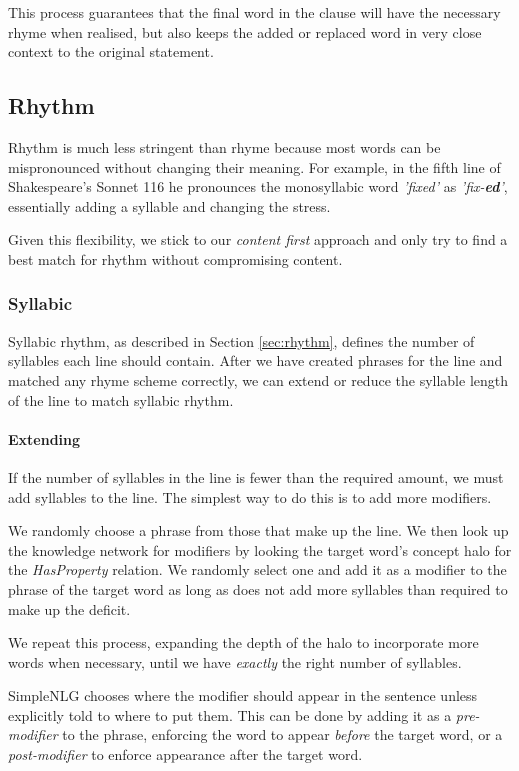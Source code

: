 This process guarantees that the final word in the clause will have the necessary rhyme when realised, but also keeps the added or replaced word in very close context to the original statement.


\subsection{Rhythm}
Rhythm is much less stringent than rhyme because most words can be mispronounced without changing their meaning. For example, in the fifth line of Shakespeare's Sonnet 116 he pronounces the monosyllabic word \textit{'fixed'} as \textit{'fix-\textbf{ed}'}, essentially adding a syllable and changing the stress.

Given this flexibility, we stick to our \textit{content first} approach and only try to find a best match for rhythm without compromising content. 

\subsubsection{Syllabic}
Syllabic rhythm, as described in Section \ref{sec:rhythm}, defines the number of syllables each line should contain. After we have created phrases for the line and matched any rhyme scheme correctly, we can extend or reduce the syllable length of the line to match syllabic rhythm.

\paragraph{Extending}
If the number of syllables in the line is fewer than the required amount, we must add syllables to the line. The simplest way to do this is to add more modifiers.

We randomly choose a phrase from those that make up the line. We then look up the knowledge network for modifiers by looking the target word's concept halo for the \textit{HasProperty} relation. We randomly select one and add it as a modifier to the phrase of the target word as long as does not add more syllables than required to make up the deficit.

We repeat this process, expanding the depth of the halo to incorporate more words when necessary, until we have \textit{exactly} the right number of syllables.

SimpleNLG chooses where the modifier should appear in the sentence unless explicitly told to where to put them. This can be done by adding it as a \textit{pre-modifier} to the phrase, enforcing the word to appear \textit{before} the target word, or a \textit{post-modifier} to enforce appearance after the target word.

